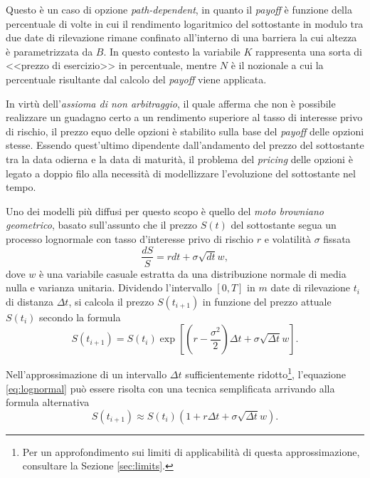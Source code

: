 Questo è un caso di opzione \textit{path-dependent}, in quanto il \textit{payoff} è funzione della percentuale di volte in cui il rendimento logaritmico del sottostante in modulo tra due date di rilevazione rimane confinato all'interno di una barriera la cui altezza è parametrizzata da $B$. In questo contesto la variabile $K$ rappresenta una sorta di <<prezzo di esercizio>> in percentuale, mentre $N$ è il nozionale a cui la percentuale risultante dal calcolo del \textit{payoff} viene applicata.

In virtù dell'\textit{assioma di non arbitraggio}, il quale afferma che non è possibile realizzare un guadagno certo a un rendimento superiore al tasso di interesse privo di rischio, il prezzo equo delle opzioni è stabilito sulla base del \textit{payoff} delle opzioni stesse. Essendo quest'ultimo dipendente dall'andamento del prezzo del sottostante tra la data odierna e la data di maturità, il problema del \textit{pricing} delle opzioni è legato a doppio filo alla necessità di modellizzare l'evoluzione del sottostante nel tempo.

Uno dei modelli più diffusi per questo scopo è quello del \textit{moto browniano geometrico}, basato sull'assunto che il prezzo $S(t)$ del sottostante segua un processo lognormale con tasso d'interesse privo di rischio $r$ e volatilità $\sigma$ fissata
\begin{equation}
    \frac{dS}{S} = r dt + \sigma \sqrt{dt} w,
    \label{eq:lognormal}
\end{equation}
dove $w$ è una variabile casuale estratta da una distribuzione normale di media nulla e varianza unitaria. Dividendo l'intervallo $[0,T]$ in $m$ date di rilevazione $t_i$ di distanza $\Delta t$, si calcola il prezzo $S(t_{i+1})$ in funzione del prezzo attuale $S(t_i)$ secondo la formula
\begin{equation}
    S(t_{i+1}) = S(t_i) \exp{\left[\left(r- \frac{\sigma^2}{2}\right)\Delta t + \sigma \sqrt{\Delta t} w\right]}.
    \label{eq:exactprice}
\end{equation}

Nell'approssimazione di un intervallo $\Delta t$ sufficientemente ridotto\footnote{Per un approfondimento sui limiti di applicabilità di questa approssimazione, consultare la Sezione \ref{sec:limits}.}, l'equazione \eqref{eq:lognormal} può essere risolta con una tecnica semplificata arrivando alla formula alternativa
\begin{equation}
    S(t_{i+1}) \approx S(t_i) \left(1 + r \Delta t + \sigma \sqrt{\Delta t} w\right).
    \label{eq:eulerprice}
\end{equation}

